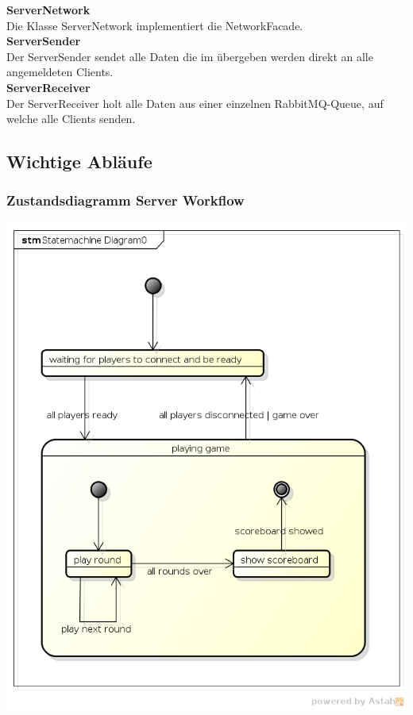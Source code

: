 \documentclass[11pt]{scrartcl}
\begin{document}
\textbf{ServerNetwork}\\
Die Klasse ServerNetwork implementiert die NetworkFacade.\\

\textbf{ServerSender}\\
Der ServerSender sendet alle Daten die im übergeben werden direkt an alle angemeldeten Clients.\\

\textbf{ServerReceiver}\\
Der ServerReceiver holt alle Daten aus einer einzelnen RabbitMQ-Queue, auf welche alle Clients senden.\\

\newpage

\subsection{Wichtige Abläufe}
\subsubsection{Zustandsdiagramm Server Workflow}
\includegraphics[scale=0.7]{StatemachineServer}
\end{document}
